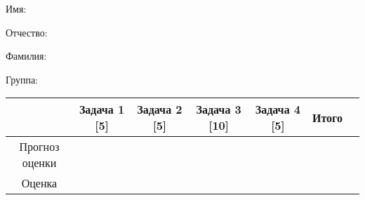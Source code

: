 \documentclass[pdftex,12pt,a4paper]{article}
\begin{document}
\begin{large}
Имя:
\end{large}

\vspace{4pt}

\begin{large}
Отчество:
\end{large}

\vspace{4pt}

\begin{large}
Фамилия:
\end{large}

\vspace{4pt}

\begin{large}
Группа:
\end{large}

\vspace{4pt} 

\begin{tabular}{|c|c|c|c|c|c|c|}
\hline  & Задача 1 [5] & Задача 2 [5] & Задача 3 [10] & Задача 4 [5] & Итого \\ 
\hline Прогноз оценки &  &  &  &  &   \\ 
\hline Оценка &  &  &  &  &   \\ 
\hline 
\end{tabular} 
\newpage
\end{document}
